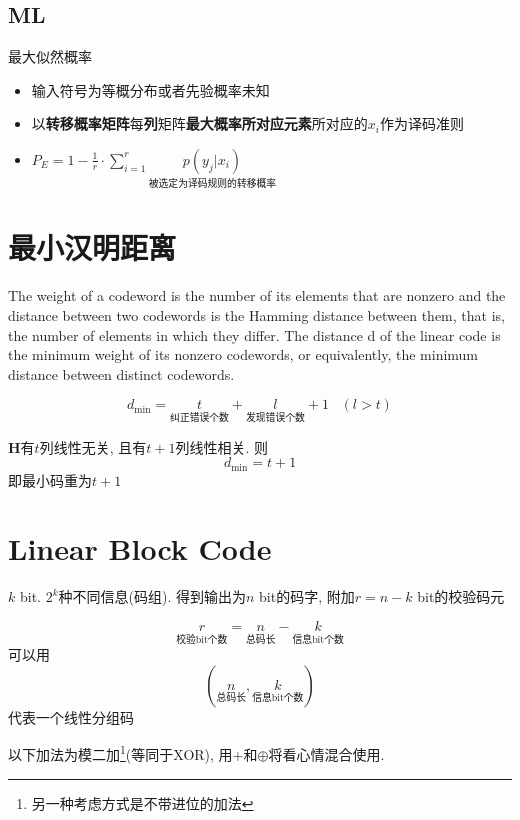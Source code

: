 \documentclass[a4paper]{report}
\begin{document}
\subsection{ML}
最大似然概率
\begin{itemize}
  \item 输入符号为等概分布或者先验概率未知
  \item 以\textbf{转移概率矩阵}每\textbf{列}矩阵\textbf{最大概率所对应元素}所对应的$x_i$作为译码准则
  \item $P_E=1-\frac{1}{r}\cdot\sum_{i=1}^{r} \underset{\text{被选定为译码规则的转移概率}}{p(y_j|x_i)}$
\end{itemize}
\section{最小汉明距离}
The weight of a codeword is the number of its elements that are nonzero and the distance between two codewords is the Hamming distance between them, that is, the number of elements in which they differ. The distance d of the linear code is the minimum weight of its nonzero codewords, or equivalently, the minimum distance between distinct codewords. 

$$d_{\min}=\underset{\text{纠正错误个数}}{t}+\underset{\text{发现错误个数}}{l}+1\;\;\;(l>t)$$

\textbf{H}有$t$列线性无关, 且有$t+1$列线性相关. 则$$d_{\min}=t+1$$即最小码重为$t+1$
\section{Linear Block Code}
$k$ bit. $2^k$种不同信息(码组). 得到输出为$n$ bit的码字, 附加$r=n-k$ bit的校验码元

$$\underset{\text{校验bit个数}}{r}=\underset{\text{总码长}}{n}-\underset{\text{信息bit个数}}{k}$$
可以用
$$(\underset{\text{总码长}}{n},\underset{\text{信息bit个数}}{k})$$
代表一个线性分组码

以下加法为模二加\footnote{另一种考虑方式是不带进位的加法}(等同于XOR), 用+和$\oplus$将看心情混合使用. 
\end{document}
